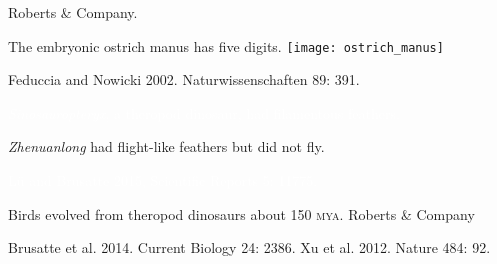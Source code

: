 \documentclass[t]{beamer}
\begin{document}
{
\begin{frame}[t]
\end{frame}
}
%
{
\begin{frame}[t]
\end{frame}
}
%
{
\begin{frame}[b]

\hfill \tiny \textcopyright Roberts \& Company.
\end{frame}
}
%
\begin{frame}[t]{The embryonic ostrich manus has five digits.}
	\centering\texttt{[image: ostrich\_manus]}
	
	\vfilll
	
	\hfill \tiny Feduccia and Nowicki 2002. Naturwissenschaften 89: 391.
\end{frame}
%
{
\begin{frame}[t,plain]{\textcolor{white}{\textit{Sinosauropteryx}, a theropod dinosaur, had filamentous feathers.}}
\end{frame}
}
%
{
\begin{frame}[b]{\textit{Zhenuanlong} had flight-like feathers but did not fly.}

\hfill \tiny \textcolor{white}{Lü and Brusatte 2015, Scientific Reports 5: 11775.}
\end{frame}
}
%
{
\begin{frame}[t]
\end{frame}
}
%
{
\begin{frame}[b]{Birds evolved from theropod dinosaurs about 150 \textsc{mya}.}
\hfill \tiny \textcopyright Roberts \& Company
\end{frame}
}
%
{
\begin{frame}[b]


\tiny Brusatte et al. 2014. Current Biology 24: 2386. \hfill Xu et al. 2012. Nature 484: 92. 
\end{frame}
}
\end{document}

